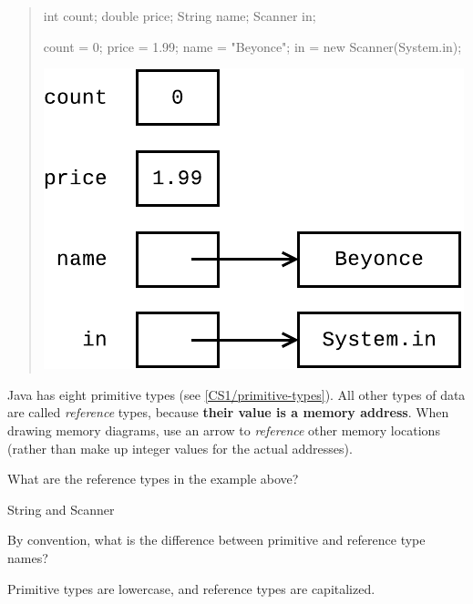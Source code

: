 
\begin{quote}
\begin{multicols}{2}

\begin{javalst}
int count;
double price;
String name;
Scanner in;

count = 0;
price = 1.99;
name = "Beyonce";
in = new Scanner(System.in);
\end{javalst}

\includegraphics[width=\linewidth]{CS1/reference1.pdf}

\end{multicols}
\end{quote}

Java has eight primitive types (see \ref{CS1/primitive-types}).
All other types of data are called \emph{reference} types, because \textbf{their value is a memory address}.
When drawing memory diagrams, use an arrow to \emph{reference} other memory locations (rather than make up integer values for the actual addresses).




\Q What are the reference types in the example above?

\begin{answer}
String and Scanner
\end{answer}


\Q By convention, what is the difference between primitive and reference type names?

\begin{answer}
Primitive types are lowercase, and reference types are capitalized.
\end{answer}


